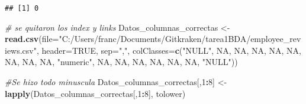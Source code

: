 \documentclass[]{article}
\newenvironment{Shaded}{\begin{snugshade}}{\end{snugshade}}
\newcommand{\KeywordTok}[1]{\textcolor[rgb]{0.13,0.29,0.53}{\textbf{#1}}}
\newcommand{\DataTypeTok}[1]{\textcolor[rgb]{0.13,0.29,0.53}{#1}}
\newcommand{\DecValTok}[1]{\textcolor[rgb]{0.00,0.00,0.81}{#1}}
\newcommand{\StringTok}[1]{\textcolor[rgb]{0.31,0.60,0.02}{#1}}
\newcommand{\CommentTok}[1]{\textcolor[rgb]{0.56,0.35,0.01}{\textit{#1}}}
\newcommand{\OtherTok}[1]{\textcolor[rgb]{0.56,0.35,0.01}{#1}}
\newcommand{\OperatorTok}[1]{\textcolor[rgb]{0.81,0.36,0.00}{\textbf{#1}}}
\newcommand{\NormalTok}[1]{#1}
\begin{document}
\begin{verbatim}
## [1] 0
\end{verbatim}

\begin{Shaded}
\begin{Highlighting}[]
\CommentTok{# se quitaron los index y links}
\NormalTok{Datos_columnas_correctas <-}\StringTok{ }\KeywordTok{read.csv}\NormalTok{(}\DataTypeTok{file=}\StringTok{"C:/Users/franc/Documents/Gitkraken/tarea1BDA/employee_reviews.csv"}\NormalTok{, }\DataTypeTok{header=}\OtherTok{TRUE}\NormalTok{, }\DataTypeTok{sep=}\StringTok{","}\NormalTok{, }\DataTypeTok{colClasses=}\KeywordTok{c}\NormalTok{(}\StringTok{"NULL"}\NormalTok{, }\OtherTok{NA}\NormalTok{, }\OtherTok{NA}\NormalTok{, }\OtherTok{NA}\NormalTok{, }\OtherTok{NA}\NormalTok{, }\OtherTok{NA}\NormalTok{, }\OtherTok{NA}\NormalTok{, }\OtherTok{NA}\NormalTok{, }\OtherTok{NA}\NormalTok{, }\StringTok{"numeric"}\NormalTok{, }\OtherTok{NA}\NormalTok{, }\OtherTok{NA}\NormalTok{, }\OtherTok{NA}\NormalTok{, }\OtherTok{NA}\NormalTok{, }\OtherTok{NA}\NormalTok{, }\OtherTok{NA}\NormalTok{, }\StringTok{"NULL"}\NormalTok{))}


\CommentTok{#Se hizo todo minuscula}
\NormalTok{Datos_columnas_correctas[,}\DecValTok{1}\OperatorTok{:}\DecValTok{8}\NormalTok{] <-}\StringTok{ }\KeywordTok{lapply}\NormalTok{(Datos_columnas_correctas[,}\DecValTok{1}\OperatorTok{:}\DecValTok{8}\NormalTok{], tolower)}


\end{Highlighting}
\end{Shaded}
\end{document}
